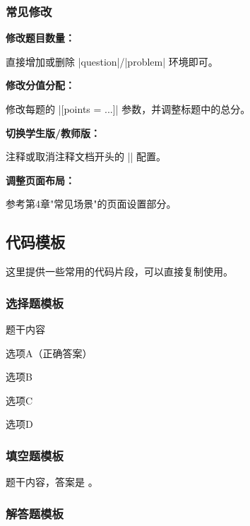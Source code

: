 \subsubsection{常见修改}

\textbf{修改题目数量：}

直接增加或删除 |question|/|problem| 环境即可。

\textbf{修改分值分配：}

修改每题的 |[points = ...]| 参数，并调整标题中的总分。

\textbf{切换学生版/教师版：}

注释或取消注释文档开头的 |\examsetup| 配置。

\textbf{调整页面布局：}

参考第4章"常见场景"的页面设置部分。

\subsection{代码模板}

这里提供一些常用的代码片段，可以直接复制使用。

\subsubsection{选择题模板}

\begin{latexcode}
  \begin{question}
    题干内容 \paren[A]
    \begin{choices}
      \item 选项A（正确答案）
      \item 选项B
      \item 选项C
      \item 选项D
    \end{choices}
  \end{question}
\end{latexcode}

\subsubsection{填空题模板}

\begin{latexcode}
  \begin{question}
    题干内容，答案是 \fillin[答案] 。
  \end{question}
\end{latexcode}

\subsubsection{解答题模板}

